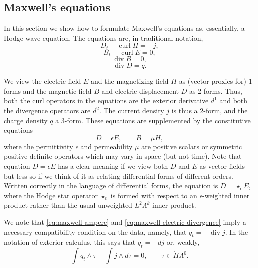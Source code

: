 \subsection{{Maxwell's equations}}\label{sec:maxwell-equations}

{In this section we show how to formulate Maxwell's equations as, essentially, a Hodge wave equation. The equations are, in traditional notation,}
\begin{equation}\label{eq:maxwell-ampere}D_t-\operatorname{curl}H=-j,\end{equation}
\begin{equation}\label{eq:maxwell-faraday}B_t+\operatorname{curl}E=0,\end{equation}
\begin{equation}\label{eq:maxwell-magnetic-divergence}\operatorname{div}B=0,\end{equation}
\begin{equation}\label{eq:maxwell-electric-divergence}\operatorname{div}D=q.\end{equation}

{We view the electric field $E$ and the magnetizing field $H$ as (vector proxies for) 1-forms and the magnetic field $B$ and electric displacement $D$ as 2-forms. Thus, both the curl operators in the equations are the exterior derivative $d^1$ and both the divergence operators are $d^2$. The current density $j$ is thus a 2-form, and the charge density $q$ a 3-form. These equations are supplemented by the constitutive equations}
\[
D=\epsilon E,\qquad B=\mu H,
\]
{where the permittivity $\epsilon$ and permeability $\mu$ are positive scalars or symmetric positive definite operators which may vary in space (but not time). Note that equation $D=\epsilon E$ has a clear meaning if we view both $D$ and $E$ as vector fields but less so if we think of it as relating differential forms of different orders. Written correctly in the language of differential forms, the equation is $D=\star_\epsilon E$, where the Hodge star operator $\star_\epsilon$ is formed with respect to an $\epsilon$-weighted inner product rather than the usual unweighted $L^2\Lambda^k$ inner product.}

{We note that \eqref{eq:maxwell-ampere} and \eqref{eq:maxwell-electric-divergence} imply a necessary compatibility condition on the data, namely, that $q_t=-\operatorname{div}j$. In the notation of exterior calculus, this says that $q_t=-dj$ or, weakly,}
\begin{equation}\label{eq:maxwell-data-compatibility}
\int q_t\wedge\tau-\int j\wedge d\tau=0,\qquad\tau\in\mathring H\Lambda^0.
\end{equation}

